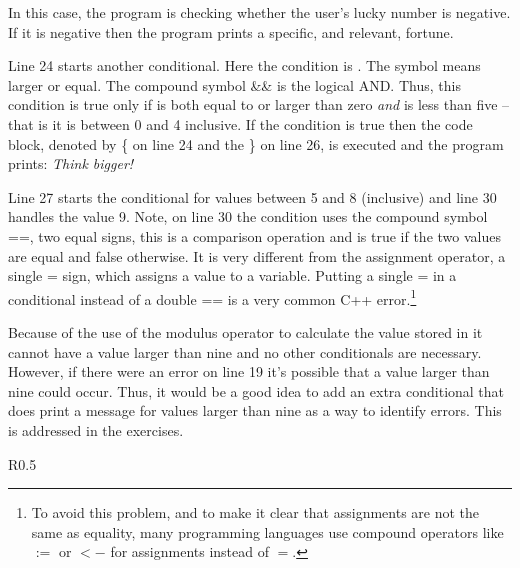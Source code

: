 In this case, the program is checking whether the user's lucky number is negative.  If it is negative then the program prints a specific, and relevant, fortune.

Line 24 starts another conditional.  Here the condition is .  The symbol \cf{$>=$} means larger or equal.  The compound symbol \&\& is the logical AND.  Thus, this condition is true only if  is both equal to or larger than zero \emph{and} is less than five -- that is it is between 0 and 4 inclusive.  If the condition is true then the code block, denoted by \{ on line 24 and the \} on line 26, is executed and the program prints: \emph{Think bigger!}

Line 27 starts the conditional for values between 5 and 8 (inclusive) and line 30 handles the value 9.  Note, on line 30 the condition uses the compound symbol ==, two equal signs, this is a comparison operation and is true if the two values are equal and false otherwise.  It is very different from the assignment operator, a single = sign, which assigns a value to a variable.  Putting a single = in a conditional instead of a double == is a very common C++ error.\footnote{To avoid this problem, and to make it clear that assignments are not the same as equality, many programming languages use compound operators like $:=$ or $<-$ for assignments instead of $=$.}

Because of the use of the modulus operator to calculate the value stored in  it cannot have a value larger than nine and no other conditionals are necessary.  However, if there were an error on line 19 it's possible that a value larger than nine could occur.  Thus, it would be a good idea to add an extra conditional that does print a message for values larger than nine as a way to identify errors.  This is addressed in the exercises.


\begin{wrapfigure}{R}{0.5\textwidth} 
\vspace{-.5cm}
\end{wrapfigure}

